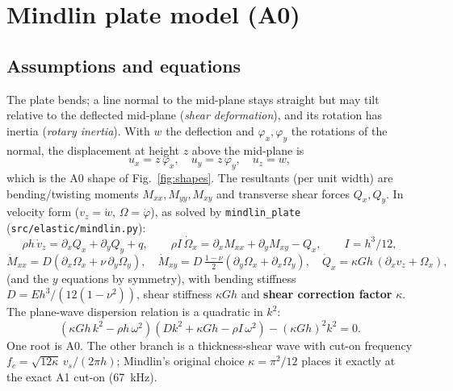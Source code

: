 \documentclass[11pt,a4paper]{article}
\newcommand{\code}[1]{\texttt{\footnotesize #1}}
\begin{document}
\FloatBarrier
\section{Mindlin plate model (A0)}
\subsection{Assumptions and equations}
The plate bends; a line normal to the mid-plane stays straight but may tilt relative to the deflected mid-plane
(\emph{shear deformation}), and its rotation has inertia (\emph{rotary inertia}). With $w$ the deflection and
$\varphi_x, \varphi_y$ the rotations of the normal, the displacement at height $z$ above the mid-plane is
\[
u_x = z\,\varphi_x, \quad u_y = z\,\varphi_y, \quad u_z = w ,
\]
which is the A0 shape of Fig.~\ref{fig:shapes}. The resultants (per unit width) are bending/twisting moments
$M_{xx}, M_{yy}, M_{xy}$ and transverse shear forces $Q_x, Q_y$. In velocity form ($v_z = \dot w$,
$\Omega = \dot\varphi$), as solved by \code{mindlin\_plate} (\code{src/elastic/mindlin.py}):
\[
\rho h\,\dot v_z = \partial_x Q_x + \partial_y Q_y + q, \qquad
\rho I\,\dot\Omega_x = \partial_x M_{xx} + \partial_y M_{xy} - Q_x, \qquad I = h^3/12,
\]
\[
\dot M_{xx} = D(\partial_x\Omega_x + \nu\,\partial_y\Omega_y), \quad
\dot M_{xy} = D\,\tfrac{1-\nu}{2}(\partial_y\Omega_x + \partial_x\Omega_y), \quad
\dot Q_x = \kappa G h\,(\partial_x v_z + \Omega_x),
\]
(and the $y$ equations by symmetry), with bending stiffness $D = E h^3/(12(1-\nu^2))$, shear stiffness $\kappa G h$ and
\textbf{shear correction factor} $\kappa$. The plane-wave dispersion relation is a quadratic in $k^2$:
\[
(\kappa G h\,k^2 - \rho h\,\omega^2)(D k^2 + \kappa G h - \rho I\,\omega^2) - (\kappa G h)^2 k^2 = 0 .
\]
One root is A0. The other branch is a thickness-shear wave with cut-on frequency
$f_c = \sqrt{12\kappa}\,v_s/(2\pi h)$; Mindlin's original choice $\kappa = \pi^2/12$ places it exactly at the exact
A1 cut-on (67~kHz).
\end{document}

